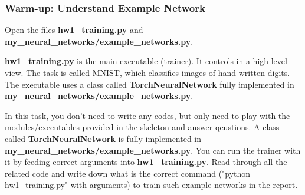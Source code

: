 \documentclass{article}
\newcommand{\homeworknumber}{1}
\begin{document}
\subsubsection*{Warm-up: Understand Example Network}

\noindent Open the files \textbf{hw1\_training.py} and \textbf{my\_neural\_networks/example\_networks.py}.

\hfill

\noindent \textbf{hw1\_training.py} is the main executable (trainer). It controls in a high-level view. The task is called MNIST, which classifies images of hand-written digits. The executable uses a class called \textbf{TorchNeuralNetwork} fully implemented in \textbf{my\_neural\_networks/example\_networks.py}.

\hfill

\noindent In this task, you don't need to write any codes, but only need to play with the modules/executables provided in the skeleton and answer qeustions. A class called \textbf{TorchNeuralNetwork} is fully implemented in \textbf{my\_neural\_networks/example\_networks.py}. You can run the trainer with it by feeding correct arguments into \textbf{hw\homeworknumber\_training.py}. Read through all the related code and write down what is the correct command ("python hw\homeworknumber\_training.py" with arguments) to train such example networks in the report.

\hfill
\end{document}
